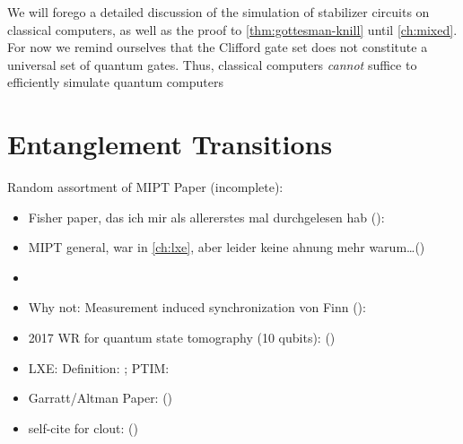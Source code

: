 We will forego a detailed discussion of the simulation of stabilizer circuits
on classical computers, as well as the proof to \cref{thm:gottesman-knill}
until \cref{ch:mixed}. For now we remind ourselves that the Clifford gate set
does not constitute a universal set of quantum gates. Thus, classical computers
\emph{cannot} suffice to efficiently simulate quantum computers

\section{Entanglement Transitions}\label{sec:ent-trans}

Random assortment of MIPT Paper (incomplete):

\begin{itemize}
  \item Fisher paper, das ich mir als allererstes mal durchgelesen hab
    ():
    \cite{liMeasurementdrivenEntanglementTransition2019}
  \item MIPT general, war in \cref{ch:lxe}, aber leider keine ahnung mehr
    warum\ldots () \cite{baoTheoryPhaseTransition2020}
  \item {}
    \cite{baoSymmetryEnrichedPhases2021}
  \item Why not: Measurement induced synchronization von Finn
    ():
    \cite{schmolkeMeasurementinducedQuantumSynchronization2023}
  \item 2017 WR for quantum state tomography (10 qubits):
    ()
    \cite{song10QubitEntanglementParallel2017}
  \item LXE: Definition: \cite{liCrossEntropyBenchmark2023}; PTIM:
    \cite{tikhanovskayaUniversalityCrossEntropy2023}
  \item Garratt/Altman Paper:
    () \cite{garrattProbingPostmeasurementEntanglement2023}
  \item self-cite for clout:
    ()
    \cite{schmolkeBoostingInformationTransfer2024}
\end{itemize}

